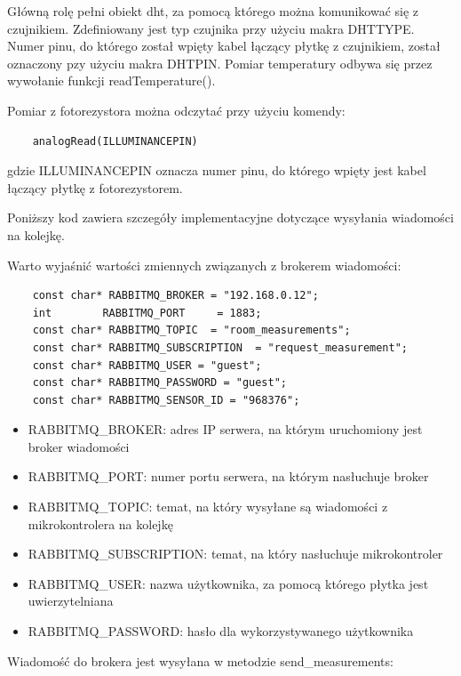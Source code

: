 \documentclass[11pt, a4]{article} %
\begin{document}
Główną rolę pełni obiekt dht, za pomocą którego można komunikować się
z czujnikiem. Zdefiniowany jest typ czujnika przy użyciu makra DHTTYPE.
Numer pinu, do którego został wpięty kabel łączący płytkę z czujnikiem,
został oznaczony pzy użyciu makra DHTPIN. Pomiar temperatury odbywa się
przez wywołanie funkcji readTemperature(). 

Pomiar z fotorezystora można odczytać przy użyciu komendy:  

\begin{lstlisting}
    analogRead(ILLUMINANCEPIN)
\end{lstlisting}

gdzie ILLUMINANCEPIN oznacza numer pinu, do 
którego wpięty jest kabel łączący płytkę z fotorezystorem.

Poniższy kod zawiera szczegóły implementacyjne dotyczące 
wysyłania wiadomości na kolejkę.



Warto wyjaśnić wartości zmiennych związanych z brokerem wiadomości:
\begin{lstlisting}
    const char* RABBITMQ_BROKER = "192.168.0.12";
    int        RABBITMQ_PORT     = 1883;
    const char* RABBITMQ_TOPIC  = "room_measurements";
    const char* RABBITMQ_SUBSCRIPTION  = "request_measurement";
    const char* RABBITMQ_USER = "guest";
    const char* RABBITMQ_PASSWORD = "guest";
    const char* RABBITMQ_SENSOR_ID = "968376";
\end{lstlisting}

\begin{itemize}
    \item RABBITMQ\_BROKER: adres IP serwera, na którym uruchomiony jest broker wiadomości
    \item RABBITMQ\_PORT: numer portu serwera, na którym nasłuchuje broker
    \item RABBITMQ\_TOPIC: temat, na który wysyłane są wiadomości z mikrokontrolera
    na kolejkę
    \item RABBITMQ\_SUBSCRIPTION: temat, na który nasłuchuje mikrokontroler
    \item RABBITMQ\_USER: nazwa użytkownika, za pomocą którego płytka jest uwierzytelniana
    \item RABBITMQ\_PASSWORD: hasło dla wykorzystywanego użytkownika
\end{itemize}

Wiadomość do brokera jest wysyłana w metodzie send\_measurements:
\end{document}
